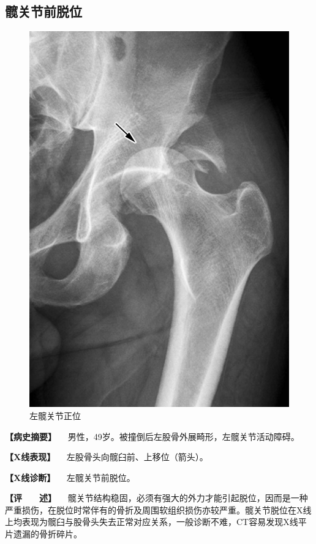 \subsection{髋关节前脱位}

\begin{figure}[!htbp]
 \centering
 \includegraphics{./images/Image00045.jpg}
 \captionsetup{justification=centering}
 \caption{左髋关节正位}
 \label{fig2-3-18}
  \end{figure} 

\textbf{【病史摘要】}
　男性，49岁。被撞倒后左股骨外展畸形，左髋关节活动障碍。

\textbf{【X线表现】} 　左股骨头向髋臼前、上移位（箭头）。

\textbf{【X线诊断】} 　左髋关节前脱位。

\textbf{【评　　述】}
　髋关节结构稳固，必须有强大的外力才能引起脱位，因而是一种严重损伤，在脱位时常伴有的骨折及周围软组织损伤亦较严重。髋关节脱位在X线上均表现为髋臼与股骨头失去正常对应关系，一般诊断不难，CT容易发现X线平片遗漏的骨折碎片。

